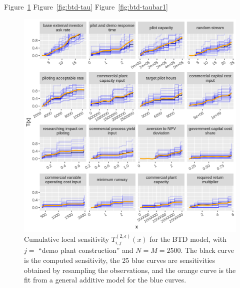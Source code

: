 \documentclass[12pt]{article}
\begin{document}
Figure~\ref{fig:btd-t}
Figure~\ref{fig:btd-tau}
Figure~\ref{fig:btd-taubar1}

\begin{figure}
    \centering
    \includegraphics[width=\linewidth]{figures/btd-t.png}
    \caption{Cumulative local sensitivity $T_{i,j}^{(2,\epsilon)}(x)$ for the BTD model, with $j =$ ``demo plant construction'' and $N = M = 2500$. The black curve is the computed sensitivity, the 25 blue curves are sensitivities obtained by resampling the observations, and the orange curve is the fit from a general additive model for the blue curves.}
    \label{fig:btd-t}
\end{figure}
\end{document}
